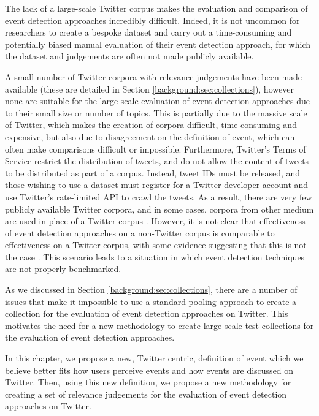 The lack of a large-scale Twitter corpus makes the evaluation and comparison of event detection approaches incredibly difficult.
Indeed, it is not uncommon for researchers to create a bespoke dataset and carry out a time-consuming and potentially biased manual evaluation of their event detection approach, for which the dataset and judgements are often not made publicly available.

A small number of Twitter corpora with relevance judgements have been made available (these are detailed in Section \ref{background:sec:collections}), however none are suitable for the large-scale evaluation of event detection approaches due to their small size or number of topics.
This is partially due to the massive scale of Twitter, which makes the creation of corpora difficult, time-consuming and expensive, but also due to disagreement on the definition of event, which can often make comparisons difficult or impossible.
Furthermore, Twitter's Terms of Service restrict the distribution of tweets, and do not allow the content of tweets to be distributed as part of a corpus.
Instead, tweet IDs must be released, and those wishing to use a dataset must register for a Twitter developer account and use Twitter's rate-limited API to crawl the tweets.
As a result, there are very few publicly available Twitter corpora, and in some cases, corpora from other medium are used in place of a Twitter corpus \citep{Aggarwal12,Petrovic:2010:SFS:1857999.1858020,Petrovic:2012:UPI:2382029.2382072}.
However, it is not clear that effectiveness of event detection approaches on a non-Twitter corpus is comparable to effectiveness on a Twitter corpus, with some evidence suggesting that this is not the case \citep{Petrovic:2012:UPI:2382029.2382072}.
This scenario leads to a situation in which event detection techniques are not properly benchmarked.

As we discussed in Section \ref{background:sec:collections}, there are a number of issues that make it impossible to use a standard pooling approach to create a collection for the evaluation of event detection approaches on Twitter.
This motivates the need for a new methodology to create large-scale test collections for the evaluation of event detection approaches.

In this chapter, we propose a new, Twitter centric, definition of event which we believe better fits how users perceive events and how events are discussed on Twitter.
Then, using this new definition, we propose a new methodology for creating a set of relevance judgements for the evaluation of event detection approaches on Twitter.

